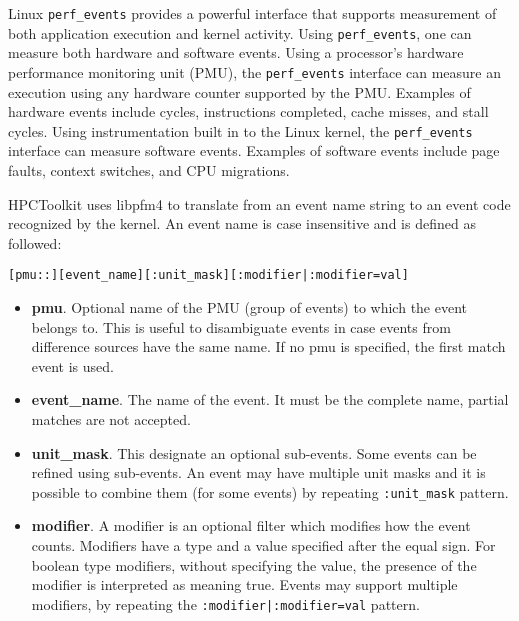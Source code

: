 \documentclass[english]{article}
\begin{document}
Linux \texttt{perf\_events} provides a powerful interface that supports 
measurement of both application execution and kernel activity. 
Using
\texttt{perf\_events}, one can measure both hardware and software events. 
Using a processor's hardware performance monitoring unit (PMU), the
\texttt{perf\_events} interface can measure an execution using any hardware counter
supported by the PMU. Examples of hardware events include cycles, instructions
completed, cache misses, and stall cycles. Using instrumentation built in to the Linux kernel,
the \texttt{perf\_events} interface can measure software events. Examples of software events include page
faults, context switches, and CPU migrations. 


HPCToolkit uses libpfm4 to translate from an event name string to an event code recognized by the kernel. 
An event name is case insensitive and is defined as followed:
\begin{verbatim}
[pmu::][event_name][:unit_mask][:modifier|:modifier=val] 
\end{verbatim}

\begin{itemize}
	\item \textbf{pmu}.  Optional name of the PMU (group of events) to which the event belongs to. This is useful to disambiguate events in case events from difference sources have the same name. If no pmu is specified, the first match event is used.
	\item \textbf{event\_name}.  The name of the event. It must be the complete name, partial matches are not accepted. 
	\item \textbf{unit\_mask}.  This designate an optional sub-events. Some events can be refined using sub-events. An event may have multiple unit masks and it is possible to combine them (for some events) by repeating \texttt{:unit\_mask} pattern.
	\item \textbf{modifier}.  A modifier is an optional filter which modifies how the event counts. Modifiers have a type and a value specified after the equal sign. 
		For boolean type modifiers, without specifying the value, the presence of the modifier is interpreted as meaning true. Events may support multiple modifiers, by repeating the \texttt{:modifier|:modifier=val} pattern. 
\end{itemize}
\end{document}
